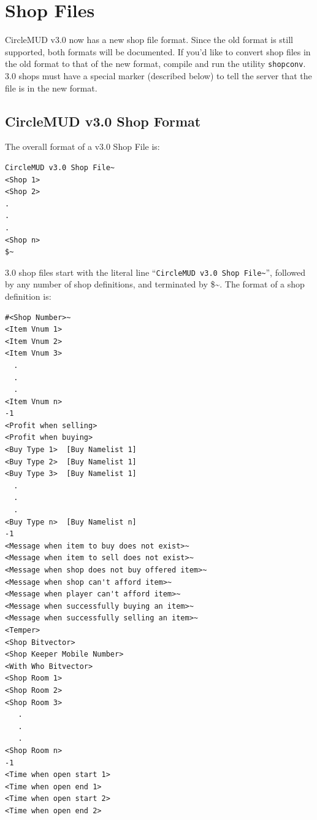\documentclass[11pt]{article}
\begin{document}
\section{Shop Files}
CircleMUD v3.0 now has a new shop file format.  Since the old format is still supported, both formats will be documented.  If you'd like to convert shop files in the old format to that of the new format, compile and run the utility \texttt{shopconv}.  3.0 shops must have a special marker (described below) to tell the server that the file is in the new format.

\subsection{CircleMUD v3.0 Shop Format}
The overall format of a v3.0 Shop File is:
\begin{verbatim}
CircleMUD v3.0 Shop File~
<Shop 1>
<Shop 2>
.
.
.
<Shop n>
$~
\end{verbatim}
3.0 shop files start with the literal line ``\texttt{CircleMUD v3.0 Shop File\~{}}'', followed by any number of shop definitions, and terminated by \$\~{}.  The format of a shop definition is:
\begin{verbatim}
#<Shop Number>~
<Item Vnum 1>
<Item Vnum 2>
<Item Vnum 3>
  .
  .
  .
<Item Vnum n>
-1
<Profit when selling>
<Profit when buying>
<Buy Type 1>  [Buy Namelist 1]
<Buy Type 2>  [Buy Namelist 1]
<Buy Type 3>  [Buy Namelist 1]
  .
  .
  .
<Buy Type n>  [Buy Namelist n]
-1
<Message when item to buy does not exist>~
<Message when item to sell does not exist>~
<Message when shop does not buy offered item>~
<Message when shop can't afford item>~
<Message when player can't afford item>~
<Message when successfully buying an item>~
<Message when successfully selling an item>~
<Temper>
<Shop Bitvector>
<Shop Keeper Mobile Number>
<With Who Bitvector>
<Shop Room 1>
<Shop Room 2>
<Shop Room 3>
   .
   .
   .
<Shop Room n>
-1
<Time when open start 1>
<Time when open end 1>
<Time when open start 2>
<Time when open end 2>
\end{verbatim}
\end{document}
